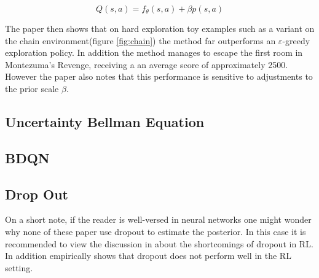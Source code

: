\begin{equation}
    Q(s,a) = f_\theta(s,a) + \beta p(s,a)
\end{equation}

The paper then shows that on hard exploration toy examples such as a variant on the chain environment(figure \ref{fig:chain}) the method far outperforms an $\varepsilon$-greedy exploration policy. In addition the method manages to escape the first room in Montezuma's Revenge, receiving a an average score of approximately 2500. However the paper also notes that this performance is sensitive to adjustments to the prior scale $\beta$.

\subsection{Uncertainty Bellman Equation}

\cite{donoghue_2017}

\subsection{BDQN}

\cite{azziz_2018}

\subsection{Drop Out}

On a short note, if the reader is well-versed in neural networks one might wonder why none of these paper use dropout to estimate the posterior. In this case it is recommended to view the discussion in \cite{osband_2018} about the shortcomings of dropout in RL. In addition \cite{azziz_2018} empirically shows that dropout does not perform well in the RL setting.

\cleardoublepage
